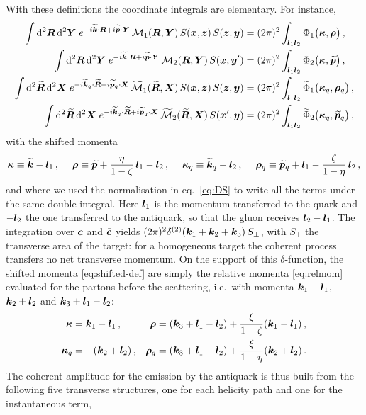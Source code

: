 With these definitions the coordinate integrals are elementary. For instance,
\begin{align}
\int{\rm d}^2\bm{R}\,{\rm d}^2\bm{Y}\;e^{-i\widetilde{\bm{k}}\cdot\bm{R}+i\widetilde{\bm{p}}\cdot\bm{Y}}\,\mathcal{M}_1(\bm{R},\bm{Y})\,S(\bm{x},\bm{z})\,S(\bm{z},\bm{y})
&=(2\pi)^2\int_{\bm{l}_1\bm{l}_2}\Phi_1\big(\bm{\kappa},\bm{\rho}\big)\,,
\nonumber\\
\int{\rm d}^2\bm{R}\,{\rm d}^2\bm{Y}\;e^{-i\widetilde{\bm{k}}\cdot\bm{R}+i\widetilde{\bm{p}}\cdot\bm{Y}}\,\mathcal{M}_2(\bm{R},\bm{Y})\,S(\bm{x},\bm{y}')
&=(2\pi)^2\int_{\bm{l}_1\bm{l}_2}\Phi_2\big(\bm{\kappa},\widetilde{\bm{p}}\big)\,,
\nonumber\\
\int{\rm d}^2\widetilde{\bm{R}}\,{\rm d}^2\bm{X}\;e^{-i\widetilde{\bm{k}}_q\cdot\widetilde{\bm{R}}+i\widetilde{\bm{p}}_q\cdot\bm{X}}\,\widetilde{\mathcal{M}}_1(\widetilde{\bm{R}},\bm{X})\,S(\bm{x},\bm{z})\,S(\bm{z},\bm{y})
&=(2\pi)^2\int_{\bm{l}_1\bm{l}_2}\widetilde\Phi_1\big(\bm{\kappa}_q,\bm{\rho}_q\big)\,,
\nonumber\\
\int{\rm d}^2\widetilde{\bm{R}}\,{\rm d}^2\bm{X}\;e^{-i\widetilde{\bm{k}}_q\cdot\widetilde{\bm{R}}+i\widetilde{\bm{p}}_q\cdot\bm{X}}\,\widetilde{\mathcal{M}}_2(\widetilde{\bm{R}},\bm{X})\,S(\bm{x}',\bm{y})
&=(2\pi)^2\int_{\bm{l}_1\bm{l}_2}\widetilde\Phi_2\big(\bm{\kappa}_q,\widetilde{\bm{p}}_q\big)\,,
\label{eq:FTs}
\end{align}
with the shifted momenta
\begin{equation}
\bm{\kappa}\equiv\widetilde{\bm{k}}-\bm{l}_1\,,\quad\;\bm{\rho}\equiv\widetilde{\bm{p}}+\frac{\eta}{1-\zeta}\,\bm{l}_1-\bm{l}_2\,,\quad\;
\bm{\kappa}_q\equiv\widetilde{\bm{k}}_q-\bm{l}_2\,,\quad\;\bm{\rho}_q\equiv\widetilde{\bm{p}}_q+\bm{l}_1-\frac{\zeta}{1-\eta}\,\bm{l}_2\,,
\label{eq:shifted-def}
\end{equation}
and where we used the normalisation in eq.~\eqref{eq:DS} to write all the terms under the same double
integral. Here $\bm{l}_1$ is the momentum transferred to the quark and $-\bm{l}_2$ the one transferred to
the antiquark, so that the gluon receives $\bm{l}_2-\bm{l}_1$. The integration over $\bm{c}$ and $\bar{\bm{c}}$
yields $(2\pi)^2\delta^{(2)}(\bm{k}_1+\bm{k}_2+\bm{k}_3)\,S_\perp$, with $S_\perp$ the transverse area of the
target: for a homogeneous target the coherent process transfers no net transverse momentum. On the
support of this $\delta$-function, the shifted momenta \eqref{eq:shifted-def} are simply the relative
momenta \eqref{eq:relmom} evaluated for the partons before the scattering, i.e.\ with momenta
$\bm{k}_1-\bm{l}_1$, $\bm{k}_2+\bm{l}_2$ and $\bm{k}_3+\bm{l}_1-\bm{l}_2$:
\begin{align}
\bm{\kappa}&=\bm{k}_1-\bm{l}_1\,,&
\bm{\rho}&=(\bm{k}_3+\bm{l}_1-\bm{l}_2)+\frac{\xi}{1-\zeta}(\bm{k}_1-\bm{l}_1)\,,
\nonumber\\
\bm{\kappa}_q&=-(\bm{k}_2+\bm{l}_2)\,,&
\bm{\rho}_q&=(\bm{k}_3+\bm{l}_1-\bm{l}_2)+\frac{\xi}{1-\eta}(\bm{k}_2+\bm{l}_2)\,.
\label{eq:shifted}
\end{align}
The coherent amplitude for the emission by the antiquark is thus built from the following five
transverse structures, one for each helicity path and one for the instantaneous term,
